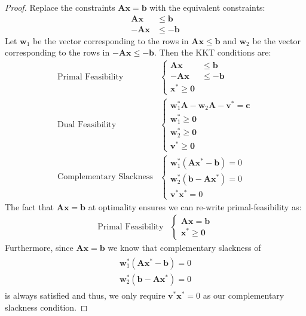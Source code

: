 \begin{proof} Replace the constraints $\mathbf{A}\mathbf{x} = \mathbf{b}$ with the equivalent constraints:
\begin{align}
\mathbf{A}\mathbf{x} &\leq \mathbf{b}\\
-\mathbf{A}\mathbf{x} &\leq -\mathbf{b}
\end{align}
Let $\mathbf{w}_1$ be the vector corresponding to the rows in $\mathbf{A}\mathbf{x} \leq \mathbf{b}$ and $\mathbf{w}_2$ be the vector corresponding to the rows in $-\mathbf{A}\mathbf{x} \leq -\mathbf{b}$. Then the KKT conditions are:
\begin{align}
\text{Primal Feasibility}&\left\{ 
\begin{aligned}
\mathbf{A}\mathbf{x} &\leq \mathbf{b}\\
-\mathbf{A}\mathbf{x} &\leq -\mathbf{b}\\
\mathbf{x}^* \geq \mathbf{0}
\end{aligned}\right.\\
\text{Dual Feasibility}&\left\{ 
\begin{aligned}
\mathbf{w}_1^*\mathbf{A} -\mathbf{w}_2\mathbf{A}- \mathbf{v}^* = \mathbf{c}\\
\mathbf{w}_1^* \geq \mathbf{0}\\
\mathbf{w}_2^* \geq \mathbf{0}\\
\mathbf{v}^* \geq \mathbf{0}
\end{aligned}\right.\\
\text{Complementary Slackness}&\left\{ 
\begin{aligned}
\mathbf{w}_1^*\left(\mathbf{A}\mathbf{x}^* - \mathbf{b}\right) = 0\\
\mathbf{w}_2^*\left(\mathbf{b} - \mathbf{A}\mathbf{x}^*\right) = 0\\
\mathbf{v}^*\mathbf{x}^* = 0
\end{aligned}\right.
\end{align}
The fact that $\mathbf{A}\mathbf{x} = \mathbf{b}$ at optimality ensures we can re-write primal-feasibility as:
\begin{align*}
\text{Primal Feasibility}&\left\{ 
\begin{aligned}
\mathbf{A}\mathbf{x} = \mathbf{b}\\
\mathbf{x}^* \geq \mathbf{0}
\end{aligned}\right.
\end{align*}
Furthermore, since $\mathbf{A}\mathbf{x} = \mathbf{b}$ we know that complementary slackness of
\begin{align*}
\begin{aligned}
\mathbf{w}_1^*\left(\mathbf{A}\mathbf{x}^* - \mathbf{b}\right) = 0\\
\mathbf{w}_2^*\left(\mathbf{b} - \mathbf{A}\mathbf{x}^*\right) = 0
\end{aligned}
\end{align*}
is always satisfied and thus, we only require $\mathbf{v}^*\mathbf{x}^* = 0$ as our complementary slackness condition.


\end{proof}
